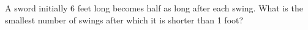 A sword initially 6 feet long becomes half as long after each swing. What is the smallest number of swings after which it is shorter than 1 foot?
